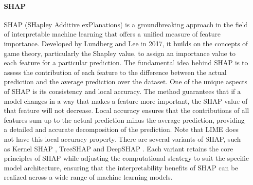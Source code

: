 \documentclass[mnsc,blindrev]{informs3}
\begin{document}
        

\paragraph{SHAP}
SHAP (SHapley Additive exPlanations) is a groundbreaking approach in the field of interpretable machine learning that offers a unified measure of feature importance. Developed by Lundberg and Lee in 2017, it builds on the concepts of game theory, particularly the Shapley value, to assign an importance value to each feature for a particular prediction. The fundamental idea behind SHAP is to assess the contribution of each feature to the difference between the actual prediction and the average prediction over the dataset. One of the unique aspects of SHAP is its consistency and local accuracy. The method guarantees that if a model changes in a way that makes a feature more important, the SHAP value of that feature will not decrease. Local accuracy ensures that the contributions of all features sum up to the actual prediction minus the average prediction, providing a detailed and accurate decomposition of the prediction. Note that LIME does not have this local accuracy property. There are several variants of SHAP, such as Kernel SHAP \citep{lundberg17shap}, TreeSHAP \citep{lundberg2018consistent} and DeepSHAP \citep{lundberg17shap}. Each variant retains the core principles of SHAP while adjusting the computational strategy to suit the specific model architecture, ensuring that the interpretability benefits of SHAP can be realized across a wide range of machine learning models.
\end{document}
